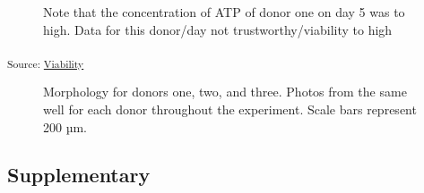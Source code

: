\documentclass[
  letterpaper,
  DIV=11,
  numbers=noendperiod,
  oneside]{scrartcl}
\begin{document}
\begin{figure}[H]


\caption{\label{fig-viability-absolute-overall}Note that the
concentration of ATP of donor one on day 5 was to high. Data for this
donor/day not trustworthy/viability to high}

\end{figure}%

\textsubscript{Source:
\href{https://andreasludvig.github.io/manuscript/notebooks/viability/Viability-preview.html\#cell-fig-viability-absolute-overall}{Viability}}

\begin{figure}


\caption{\label{fig-morph}Morphology for donors one, two, and three.
Photos from the same well for each donor throughout the experiment.
Scale bars represent 200 µm.}

\end{figure}%

\subsection{Supplementary}\label{supplementary}
\end{document}
